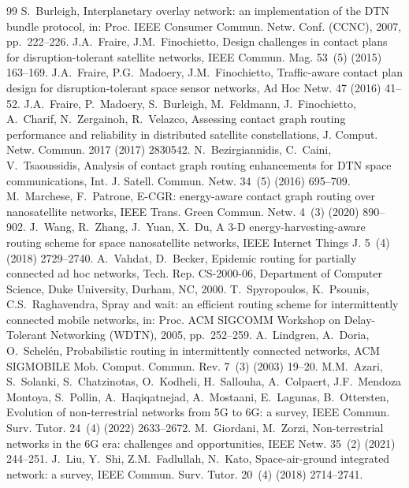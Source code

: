 \documentclass[twocolumn,3p,times,procedia]{elsarticle}
\theoremstyle{plain}
\theoremstyle{remark}
\begin{document}
\begin{thebibliography}{99}
S.~Burleigh, Interplanetary overlay network: an implementation of the DTN bundle protocol, in: Proc. IEEE Consumer Commun. Netw. Conf. (CCNC), 2007, pp.~222--226.
J.A.~Fraire, J.M.~Finochietto, Design challenges in contact plans for disruption-tolerant satellite networks, IEEE Commun. Mag. 53~(5) (2015) 163--169.
J.A.~Fraire, P.G.~Madoery, J.M.~Finochietto, Traffic-aware contact plan design for disruption-tolerant space sensor networks, Ad Hoc Netw. 47 (2016) 41--52.
J.A.~Fraire, P.~Madoery, S.~Burleigh, M.~Feldmann, J.~Finochietto, A.~Charif, N.~Zergainoh, R.~Velazco, Assessing contact graph routing performance and reliability in distributed satellite constellations, J. Comput. Netw. Commun. 2017 (2017) 2830542.
N.~Bezirgiannidis, C.~Caini, V.~Tsaoussidis, Analysis of contact graph routing enhancements for DTN space communications, Int. J. Satell. Commun. Netw. 34~(5) (2016) 695--709.
M.~Marchese, F.~Patrone, E-CGR: energy-aware contact graph routing over nanosatellite networks, IEEE Trans. Green Commun. Netw. 4~(3) (2020) 890--902.
J.~Wang, R.~Zhang, J.~Yuan, X.~Du, A 3-D energy-harvesting-aware routing scheme for space nanosatellite networks, IEEE Internet Things J. 5~(4) (2018) 2729--2740.
A.~Vahdat, D.~Becker, Epidemic routing for partially connected ad hoc networks, Tech. Rep. CS-2000-06, Department of Computer Science, Duke University, Durham, NC, 2000.
T.~Spyropoulos, K.~Psounis, C.S.~Raghavendra, Spray and wait: an efficient routing scheme for intermittently connected mobile networks, in: Proc. ACM SIGCOMM Workshop on Delay-Tolerant Networking (WDTN), 2005, pp.~252--259.
A.~Lindgren, A.~Doria, O.~Schel\'en, Probabilistic routing in intermittently connected networks, ACM SIGMOBILE Mob. Comput. Commun. Rev. 7~(3) (2003) 19--20.
M.M.~Azari, S.~Solanki, S.~Chatzinotas, O.~Kodheli, H.~Sallouha, A.~Colpaert, J.F.~Mendoza Montoya, S.~Pollin, A.~Haqiqatnejad, A.~Mostaani, E.~Lagunas, B.~Ottersten, Evolution of non-terrestrial networks from 5G to 6G: a survey, IEEE Commun. Surv. Tutor. 24~(4) (2022) 2633--2672.
M.~Giordani, M.~Zorzi, Non-terrestrial networks in the 6G era: challenges and opportunities, IEEE Netw. 35~(2) (2021) 244--251.
J.~Liu, Y.~Shi, Z.M.~Fadlullah, N.~Kato, Space-air-ground integrated network: a survey, IEEE Commun. Surv. Tutor. 20~(4) (2018) 2714--2741.

\end{thebibliography}
\end{document}
